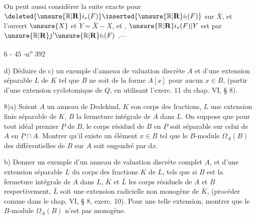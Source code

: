 On peut aussi considérer la suite exacte  pour $\deleted{\unsure{\mathbb{R}|\mathbf{R}}i_*(F)}\inserted{\unsure{\mathbb{R}|\mathbf{R}}i_!(F)}$ sur $\bar X$, et l'ouvert $\unsure{X}$ et $Y=\bar X-X$, 
et , $\unsure{\mathbb{R}|\mathbf{R}}i_*(F)|Y$ est  par $\unsure{\mathbb{R}|\mathbf{R}}j^!\unsure{\mathbb{R}|\mathbf{R}}i_!(F)$ .---

\begin{center}6 - 45 -\hfill n\textsuperscript{o} 392\end{center}

d) Déduire de c) un exemple d'anneau de valuation discrète $A$ et d'une extension séparable $L$ de $K$ tel que $B$ ne soit de la forme $A[x]$ pour aucun $x\in B$, (partir d'une extension cyclotomique de $Q$, en utilisant l'exerc. 11 du chap. VI, § 8).

8)\quad a) Soient $A$ un anneau de Dedekind, $K$ son corps des fractions, $L$ une extension finie séparable de $K$, $B$ la fermeture intégrale de $A$ dans $L$. On suppose que pour tout idéal premier $\underline P$ de $B$, le corps résiduel de $B$ en $\underline P$ soit séparable sur celui de $A$ en $\underline P\cap A$. Montrer qu'il existe un élément $x\in B$ tel que le $B$-module $\Omega_A(B)$ des différentielles de $B$ sur $A$ soit engendré par $\mathrm{d}x$.

b) Donner un exemple d'un anneau de valuation discrète complet $A$, et d'une extension séparable $L$ du corps des fractions $K$ de $L$, tels que si $B$ est la fermeture intégrale de $A$ dans $L$, $\bar K$ et $\bar L$ les corps résiduels de $A$ et $B$ respectivement, $\bar L$ soit une extension radicielle non monogène de $\bar K$, (procéder comme dans le chap. VI, § 8, exerc. 10). Pour une telle extension, montrer que le $B$-module $\Omega_A(B)$ n'est pas monogène.

